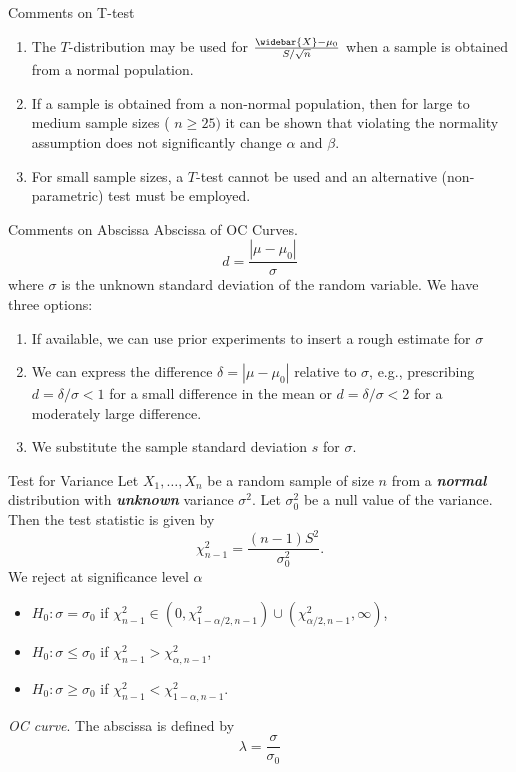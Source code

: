 \documentclass{beamer}
\newcommand{\bb}[1]{\textcolor{antiquefuchsia}{\textbf{\textit{#1}}}}
\begin{document}
\begin{frame}{Comments on T-test}
\begin{enumerate}
\item The $T$-distribution may be used for $\frac{\widebar{X}-\mu_{0}}{S / \sqrt{n}}$ when a sample is obtained from a normal population.
\item If a sample is obtained from a non-normal population, then for large to medium sample sizes ( $n \geq 25)$ it can be shown that violating the normality assumption does not significantly change $\alpha$ and $\beta$.
\item For small sample sizes, a $T$-test cannot be used and an alternative (non-parametric) test must be employed.
\end{enumerate}
\end{frame}

\begin{frame}{Comments on Abscissa}
Abscissa of OC Curves.
$$
d=\frac{\left|\mu-\mu_{0}\right|}{\sigma}
$$
where $\sigma$ is the unknown standard deviation of the random variable. We have three options:
\begin{enumerate}
\item If available, we can use prior experiments to insert a rough estimate for $\sigma$
\item We can express the difference $\delta=\left|\mu-\mu_{0}\right|$ relative to $\sigma$, e.g., prescribing $d=\delta / \sigma<1$ for a small difference in the mean or $d=\delta / \sigma<2$ for a moderately large difference.
\item We substitute the sample standard deviation $s$ for $\sigma$.
\end{enumerate}
\end{frame}

\begin{frame}{Test for Variance}
Let $X_{1}, \ldots, X_{n}$ be a random sample of size $n$ from a \bb{normal} distribution with \bb{unknown} variance $\sigma^{2}$. Let $\sigma_{0}^{2}$ be a null value of the variance. Then the test statistic is given by
$$
\chi_{n-1}^{2}=\frac{(n-1) S^{2}}{\sigma_{0}^{2}} .
$$
We reject at significance level $\alpha$
\begin{itemize}
\item $H_{0}: \sigma=\sigma_{0}$ if $\chi_{n-1}^{2} \in\left(0, \chi_{1-\alpha / 2, n-1}^{2}\right) \cup\left(\chi_{\alpha / 2, n-1}^{2}, \infty\right)$,
\item $H_{0}: \sigma \leq \sigma_{0}$ if $\chi_{n-1}^{2}>\chi_{\alpha, n-1}^{2}$,
\item $H_{0}: \sigma \geq \sigma_{0}$ if $\chi_{n-1}^{2}<\chi_{1-\alpha, n-1}^{2}$.
\end{itemize}
\textit{OC curve}. The abscissa is defined by
$$
\lambda=\frac{\sigma}{\sigma_{0}}
$$
\end{frame}
\end{document}
